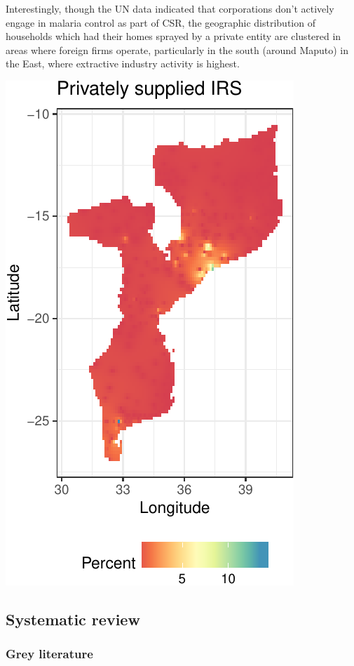 \documentclass[]{article}
\begin{document}
Interestingly, though the UN data indicated that corporations don't
actively engage in malaria control as part of CSR, the geographic
distribution of households which had their homes sprayed by a private
entity are clustered in areas where foreign firms operate, particularly
in the south (around Maputo) in the East, where extractive industry
activity is highest.

\begin{center}\includegraphics{figures/unnamed-chunk-16-1} \end{center}

\subsection{Systematic review}\label{systematic-review-1}

\subsubsection{Grey literature}\label{grey-literature-1}
\end{document}
